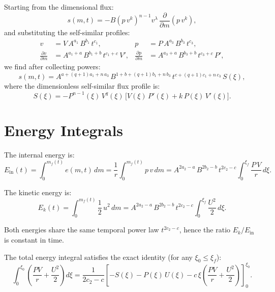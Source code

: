 \documentclass[11pt]{article}
\begin{document}
Starting from the dimensional flux:
\begin{equation}
  s(m,t) = -B\left(p\,v^k\right)^{n-1} v^{\lambda}\,
            \frac{\partial}{\partial m}\!\left(p\,v^k\right),
\end{equation}
and substituting the self-similar profiles:
\begin{align}
  v &= V\,A^{a_1}\,B^{b_1}\,t^{c_1}, &
  p &= P\,A^{a_3}\,B^{b_3}\,t^{c_3}, \\
  \frac{\partial v}{\partial m} &= A^{a_1+a}\,B^{b_1+b}\,t^{c_1+c}\,V', &
  \frac{\partial p}{\partial m} &= A^{a_3+a}\,B^{b_3+b}\,t^{c_3+c}\,P',
\end{align}
we find after collecting powers:
\begin{equation}
  s(m,t) = A^{a+(q+1)a_1+n\,a_3}\,B^{1+b+(q+1)b_1+n\,b_3}\,
            t^{c+(q+1)c_1+n\,c_3}\,S(\xi),
\end{equation}
where the dimensionless self-similar flux profile is:
\begin{equation}
  \boxed{
  S(\xi) = -P^{n-1}(\xi)\,V^{q}(\xi)\,
            \bigl[V(\xi)\,P'(\xi) + k\,P(\xi)\,V'(\xi)\bigr].}
\end{equation}

\section{Energy Integrals}
\label{sec:energy}

The internal energy is:
\begin{equation}
  E_{\mathrm{in}}(t) = \int_0^{m_f(t)} e(m,t)\,dm
  = \frac{1}{r}\int_0^{m_f(t)} p\,v\,dm
  = A^{2a_2-a}\,B^{2b_2-b}\,t^{2c_2-c}\int_0^{\xi_f}\frac{P\,V}{r}\,d\xi.
\end{equation}

The kinetic energy is:
\begin{equation}
  E_k(t) = \int_0^{m_f(t)} \frac{1}{2}\,u^2\,dm
  = A^{2a_2-a}\,B^{2b_2-b}\,t^{2c_2-c}\int_0^{\xi_f}\frac{U^2}{2}\,d\xi.
\end{equation}

Both energies share the same temporal power law $t^{2c_2-c}$, hence the ratio $E_k/E_{\mathrm{in}}$ is constant in time.

The total energy integral satisfies the exact identity (for any $\xi_0 \leq \xi_f$):
\begin{equation}
  \boxed{
  \int_0^{\xi_0}\!\left(\frac{PV}{r} + \frac{U^2}{2}\right)d\xi
  = \frac{1}{2c_2 - c}
    \left[-S(\xi) - P(\xi)\,U(\xi) - c\,\xi\left(\frac{PV}{r}+\frac{U^2}{2}\right)
    \right]_0^{\xi_0}.}
\end{equation}
\end{document}

